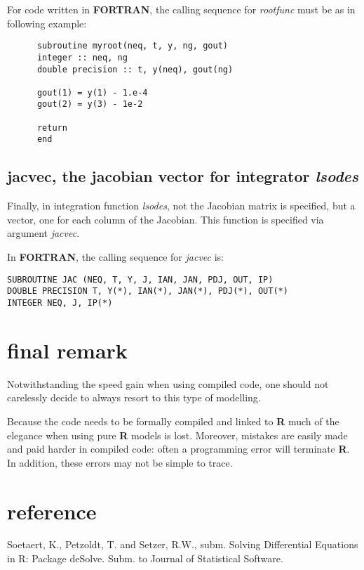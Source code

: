 \documentclass[english]{article}
\newcommand{\R}{\textbf{\textsf{R}}\xspace}
\newcommand{\FOR}{\textbf{\textsf{FORTRAN}}\xspace}
\begin{document}
For code written in \FOR, the calling sequence for \emph{rootfunc} must be as in
following example:
\begin{verbatim}
      subroutine myroot(neq, t, y, ng, gout)
      integer :: neq, ng
      double precision :: t, y(neq), gout(ng)

      gout(1) = y(1) - 1.e-4
      gout(2) = y(3) - 1e-2

      return
      end
\end{verbatim}
\subsection{jacvec, the jacobian vector for integrator \emph{lsodes}}
Finally, in integration function \emph{lsodes}, not the Jacobian matrix
is specified, but a vector, one for each column of the Jacobian.
This function is specified via argument \emph{jacvec}.


In \FOR, the calling sequence for \emph{jacvec} is:
\begin{verbatim}
SUBROUTINE JAC (NEQ, T, Y, J, IAN, JAN, PDJ, OUT, IP)
DOUBLE PRECISION T, Y(*), IAN(*), JAN(*), PDJ(*), OUT(*)
INTEGER NEQ, J, IP(*)
\end{verbatim}


\section{final remark}
Notwithstanding the speed gain when using compiled code, one should not carelessly
decide to always resort to this type of modelling.

Because the code needs to be formally compiled and linked to \R much of the elegance
when using pure \R models is lost. Moreover, mistakes are easily made and paid harder
in compiled code: often a programming error will terminate \R. In addition, these errors
may not be simple to trace.

\section{reference}
Soetaert, K., Petzoldt, T. and Setzer, R.W., subm. Solving
Differential Equations in R: Package deSolve. Subm. to Journal of
Statistical Software.
\end{document}
